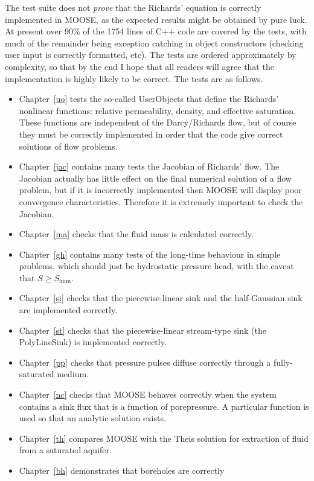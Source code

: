\documentclass[]{scrreprt}
\begin{document}
The test suite does not {\em prove} that the Richards' equation is
correctly implemented in MOOSE, as the expected results might be
obtained by pure luck.  At present over 90\% of the 1754 lines of C++
code are covered by the tests, with much of the remainder being
exception catching in object constructors (checking user input is
correctly formatted, etc).  The tests are ordered approximately by
complexity, so that by the end I hope that all readers will agree that
the implementation is highly likely to be correct.  The tests are as
follows.
\begin{itemize}
\item Chapter~\ref{uo} tests the so-called UserObjects that define the
 Richards' nonlinear functions: relative permeability, density, and
 effective saturation.  These functions are independent of the
 Darcy/Richards flow, but of course they must be correctly implemented
 in order that the code give correct solutions of flow problems.
\item Chapter~\ref{jac} contains many tests the Jacobian of Richards'
  flow.  The Jacobian actually has little effect on the final
  numerical solution of a flow problem, but if it is incorrectly
  implemented then MOOSE will display poor convergence
  characteristics.  Therefore it is extremely important to check the
  Jacobian.
\item Chapter~\ref{ma} checks that the fluid mass is calculated correctly.
\item Chapter~\ref{gh} contains many tests of the long-time behaviour
  in simple problems, which should just be hydrostatic pressure head,
  with the caveat that $S\geq S_{\mathrm{imm}}$.
\item Chapter~\ref{si} checks that the piecewise-linear sink and the
  half-Gaussian sink are implemented correctly.
\item Chapter~\ref{st} checks that the piecewise-linear stream-type
  sink (the PolyLineSink) is implemented correctly.
\item Chapter~\ref{pp} checks that pressure pulses diffuse correctly
  through a fully-saturated medium.
\item Chapter~\ref{nc} checks that MOOSE behaves correctly when the
  system contains a sink flux that is a function of porepressure.  A
  particular function is used so that an analytic solution exists.
\item Chapter~\ref{th} compares MOOSE with the Theis solution for
  extraction of fluid from a saturated aquifer.
\item Chapter~\ref{bh} demonstrates that boreholes are correctly

\end{itemize}
\end{document}
